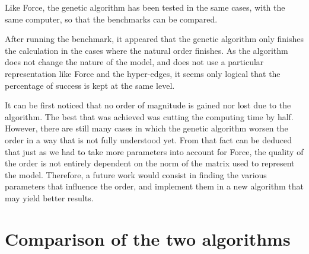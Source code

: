 \documentclass[12pt]{report}
\begin{document}
Like Force, the genetic algorithm has been tested in the same cases, with the same computer, so that the benchmarks can be compared.

After running the benchmark, it appeared that the genetic algorithm only finishes the calculation in the cases where the natural order finishes. As the algorithm does not change the nature of the model, and does not use a particular representation like Force and the hyper-edges, it seems only logical that the percentage of success is kept at the same level.

It can be first noticed that no order of magnitude is gained nor lost due to the algorithm. The best that was achieved was cutting the computing time by half. However, there are still many cases in which the genetic algorithm worsen the order in a way that is not fully understood yet. From that fact can be deduced that just as we had to take more parameters into account for Force, the quality of the order is not entirely dependent on the norm of the matrix used to represent the model. Therefore, a future work would consist in finding the various parameters that influence the order, and implement them in a new algorithm that may yield better results.

\section{Comparison of the two algorithms}

\begin{table}[!h]
  \begin{center}
    \hspace*{-1cm}
    \label{all_results}
    \caption{Experimental results (in percentages)}
  \end{center}
\end{table}
\end{document}
